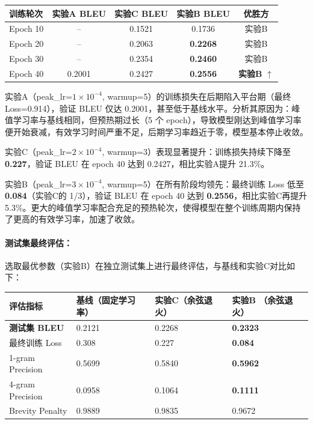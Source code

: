 \documentclass[11pt,a4paper]{article}
\begin{document}
\begin{table}[h]
\centering
\begin{tabular}{lcccc}
\toprule
训练轮次 & 实验A BLEU & 实验C BLEU & 实验B BLEU & 优胜方 \\
\midrule
Epoch 10 & -- & 0.1521 & 0.1736 & 实验B \\
Epoch 20 & -- & 0.2063 & \textbf{0.2268} & 实验B \\
Epoch 30 & -- & 0.2354 & \textbf{0.2460} & 实验B \\
Epoch 40 & 0.2001 & 0.2427 & \textbf{0.2556} & \textbf{实验B} $\uparrow$ \\
\bottomrule
\end{tabular}
\end{table}

实验A（peak\_lr=$1\times 10^{-4}$, warmup=5）的训练损失在后期陷入平台期（最终 Loss=0.914），验证 BLEU 仅达 0.2001，甚至低于基线水平。分析其原因为：峰值学习率与基线相同，但预热期过长（5 个 epoch），导致模型刚达到峰值学习率便开始衰减，有效学习时间严重不足，后期学习率趋近于零，模型基本停止收敛。

实验C（peak\_lr=$2\times 10^{-4}$, warmup=3）表现显著提升：训练损失持续下降至 \textbf{0.227}，验证 BLEU 在 epoch 40 达到 0.2427，相比实验A提升 21.3\%。

实验B（peak\_lr=$3\times 10^{-4}$, warmup=5）在所有阶段均领先：最终训练 Loss 低至 \textbf{0.084}（实验C的 1/3），验证 BLEU 在 epoch 40 达到 \textbf{0.2556}，相比实验C再提升 5.3\%。更大的峰值学习率配合充足的预热轮次，使得模型在整个训练周期内保持了更高的有效学习率，加速了收敛。

\paragraph{测试集最终评估：}
选取最优参数（实验B）在独立测试集上进行最终评估，与基线和实验C对比如下：

\begin{table}[h]
\centering
\begin{tabular}{llll}
\toprule
评估指标 & 基线（固定学习率） & 实验C（余弦退火） & \textbf{实验B} \textbf{（余弦退火）} \\
\midrule
\textbf{测试集 BLEU} & 0.2121 & 0.2268 & \textbf{0.2323} \\
最终训练 Loss & 0.308 & 0.227 & \textbf{0.084} \\
1-gram Precision & 0.5699 & 0.5840 & \textbf{0.5962} \\
4-gram Precision & 0.0958 & 0.1064 & \textbf{0.1111} \\
Brevity Penalty & 0.9889 & 0.9835 & 0.9672 \\
\bottomrule
\end{tabular}
\end{table}
\end{document}
